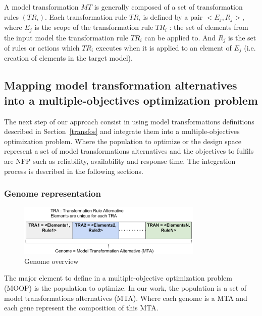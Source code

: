 \documentclass[conference]{IEEEtran}
\begin{document}
A model transformation $MT$ is generally composed of a set of transformation rules $(TR_{i})$. Each transformation rule $TR_{i}$ is defined by a pair $<E_{j},R_{j}>$, where $E_{j}$ is the scope of the transformation rule $TR_{i}$ : the set of elements from the input model the transformation rule $TR_{i}$ can be applied to. And $R_{j}$ is the set of rules or actions which $TR_{i}$ executes when it is applied to an element of $E_{j}$ (i.e. creation of elements in the target model).


\subsection{Mapping model transformation alternatives into a multiple-objectives optimization problem}
\label{Adapting}
The next step of our approach consist in using model transformations definitions described in Section~\ref{transfos} and integrate them into a multiple-objectives optimization problem. Where the population to optimize or the design space represent a set of model transformations alternatives and the objectives to fulfils are NFP such as reliability, availability and response time. The integration process is described in the following sections.
\subsubsection{\textbf{Genome representation}}

\begin{figure}[!ht]
\centering
\includegraphics[width=3.49in]{genome.pdf}
\caption{Genome overview}
\label{genome}
\end{figure}

The major element to define in a multiple-objective optimization problem (MOOP) is the population to optimize. In our work, the population is a set of model transformations alternatives (MTA). Where each genome is a MTA and each gene represent the composition of this MTA.
\end{document}
